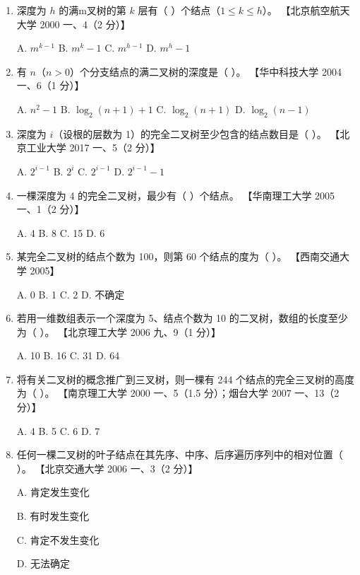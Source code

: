 \documentclass[lang=cn,newtx,10pt,scheme=chinese]{../../elegantbook}
\begin{document}
\begin{enumerate}
    \item 深度为 $h$ 的满m叉树的第 $k$ 层有（ ）个结点（$1 \leq k \leq h$）。  
    【北京航空航天大学 2000 一、4（2 分）】  
    
    A. $m^{k-1}$ \quad B. $m^{k} - 1$ \quad C. $m^{h-1}$ \quad D. $m^{h} - 1$  

    \item 有 $n$（$n > 0$）个分支结点的满二叉树的深度是（ ）。  
    【华中科技大学 2004 一、6（1 分）】  

    A. $n^2 - 1$ \quad B. $\log_2 (n + 1) + 1$ \quad C. $\log_2 (n + 1)$ \quad D. $\log_2 (n - 1)$  

    \item 深度为 $i$（设根的层数为 1）的完全二叉树至少包含的结点数目是（ ）。  
    【北京工业大学 2017 一、5（2 分）】  

    A. $2^{i-1}$ \quad B. $2^i$ \quad C. $2^{i - 1}$ \quad D. $2^{i-1} - 1$  

    \item 一棵深度为 4 的完全二叉树，最少有（ ）个结点。  
    【华南理工大学 2005 一、1（2 分）】  

    A. 4 \quad B. 8 \quad C. 15 \quad D. 6  

    \item 某完全二叉树的结点个数为 100，则第 60 个结点的度为（ ）。  
    【西南交通大学 2005】  

    A. 0 \quad B. 1 \quad C. 2 \quad D. 不确定  

    \item 若用一维数组表示一个深度为 5、结点个数为 10 的二叉树，数组的长度至少为（ ）。  
    【北京理工大学 2006 九、9（1 分）】 

    A. 10 \quad B. 16 \quad C. 31 \quad D. 64  

    \item 将有关二叉树的概念推广到三叉树，则一棵有 244 个结点的完全三叉树的高度为（ ）。  
    【南京理工大学 2000 一、5（1.5 分）；烟台大学 2007 一、13（2 分）】 

    A. 4 \quad B. 5 \quad C. 6 \quad D. 7  

    \item 任何一棵二叉树的叶子结点在其先序、中序、后序遍历序列中的相对位置（ ）。  
    【北京交通大学 2006 一、3（2 分）】  

    A. 肯定发生变化  

    B. 有时发生变化  

    C. 肯定不发生变化  

    D. 无法确定  


\end{enumerate}
\end{document}
